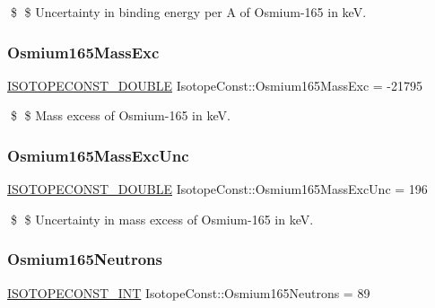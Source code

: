 \$ \$ Uncertainty in binding energy per A of Osmium-\/165 in keV. \mbox{\label{group___isotope_const-_osmium-_os165_gaf95b7337896f76e86deba2ab30db945a}} 
\subsubsection{\texorpdfstring{Osmium165\+Mass\+Exc}{Osmium165MassExc}}
{\footnotesize\ttfamily \mbox{\hyperlink{group___isotope_const-_macros_ga8f45a7272ce02c0b4c65c44636ed719a}{I\+S\+O\+T\+O\+P\+E\+C\+O\+N\+S\+T\+\_\+\+D\+O\+U\+B\+LE}} Isotope\+Const\+::\+Osmium165\+Mass\+Exc = -\/21795}

\$ \$ Mass excess of Osmium-\/165 in keV. \mbox{\label{group___isotope_const-_osmium-_os165_gad191f765634e6bf71adc181cbbb7ede2}} 
\subsubsection{\texorpdfstring{Osmium165\+Mass\+Exc\+Unc}{Osmium165MassExcUnc}}
{\footnotesize\ttfamily \mbox{\hyperlink{group___isotope_const-_macros_ga8f45a7272ce02c0b4c65c44636ed719a}{I\+S\+O\+T\+O\+P\+E\+C\+O\+N\+S\+T\+\_\+\+D\+O\+U\+B\+LE}} Isotope\+Const\+::\+Osmium165\+Mass\+Exc\+Unc = 196}

\$ \$ Uncertainty in mass excess of Osmium-\/165 in keV. \mbox{\label{group___isotope_const-_osmium-_os165_gacee42559e9e31d7258de50961d0b44ff}} 
\subsubsection{\texorpdfstring{Osmium165\+Neutrons}{Osmium165Neutrons}}
{\footnotesize\ttfamily \mbox{\hyperlink{group___isotope_const-_macros_ga5f18360b3e99483a35c32d789e62621c}{I\+S\+O\+T\+O\+P\+E\+C\+O\+N\+S\+T\+\_\+\+I\+NT}} Isotope\+Const\+::\+Osmium165\+Neutrons = 89}

